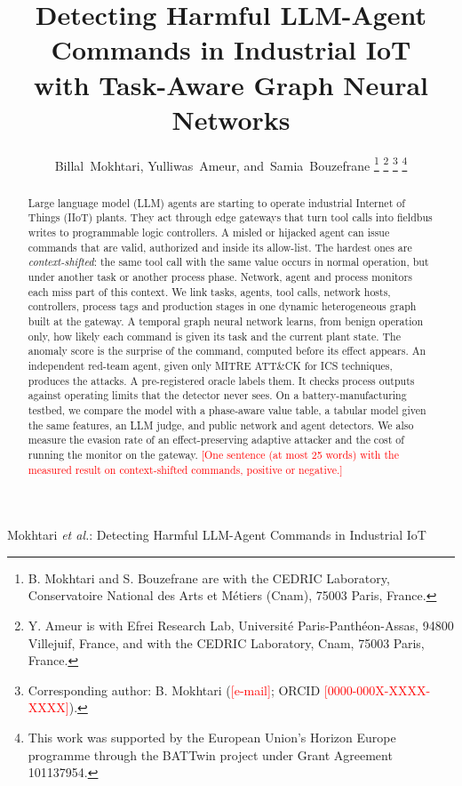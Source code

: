 \documentclass[journal]{IEEEtran}
\newcommand{\billal}[1]{\textcolor{red}{#1}}
\begin{document}
\title{Detecting Harmful LLM-Agent Commands in Industrial IoT\\ with Task-Aware Graph Neural Networks}

\author{Billal~Mokhtari,
        Yulliwas~Ameur,
        and~Samia~Bouzefrane%
\thanks{B. Mokhtari and S. Bouzefrane are with the CEDRIC Laboratory, Conservatoire National des Arts et Métiers (Cnam), 75003 Paris, France.}%
\thanks{Y. Ameur is with Efrei Research Lab, Université Paris-Panthéon-Assas, 94800 Villejuif, France, and with the CEDRIC Laboratory, Cnam, 75003 Paris, France.}%
\thanks{Corresponding author: B. Mokhtari (\billal{[e-mail]}; ORCID \billal{[0000-000X-XXXX-XXXX]}).}%
\thanks{This work was supported by the European Union's Horizon Europe programme through the BATTwin project under Grant Agreement 101137954.}}

%
{Mokhtari \MakeLowercase{\textit{et al.}}: Detecting Harmful LLM-Agent Commands in Industrial IoT}

\maketitle

\begin{abstract}
Large language model (LLM) agents are starting to operate industrial Internet of Things (IIoT) plants. They act through edge gateways that turn tool calls into fieldbus writes to programmable logic controllers. A misled or hijacked agent can issue commands that are valid, authorized and inside its allow-list. The hardest ones are \emph{context-shifted}: the same tool call with the same value occurs in normal operation, but under another task or another process phase. Network, agent and process monitors each miss part of this context. We link tasks, agents, tool calls, network hosts, controllers, process tags and production stages in one dynamic heterogeneous graph built at the gateway. A temporal graph neural network learns, from benign operation only, how likely each command is given its task and the current plant state. The anomaly score is the surprise of the command, computed before its effect appears. An independent red-team agent, given only MITRE ATT\&CK for ICS techniques, produces the attacks. A pre-registered oracle labels them. It checks process outputs against operating limits that the detector never sees. On a battery-manufacturing testbed, we compare the model with a phase-aware value table, a tabular model given the same features, an LLM judge, and public network and agent detectors. We also measure the evasion rate of an effect-preserving adaptive attacker and the cost of running the monitor on the gateway. \billal{[One sentence (at most 25 words) with the measured result on context-shifted commands, positive or negative.]}
\end{abstract}
\end{document}
